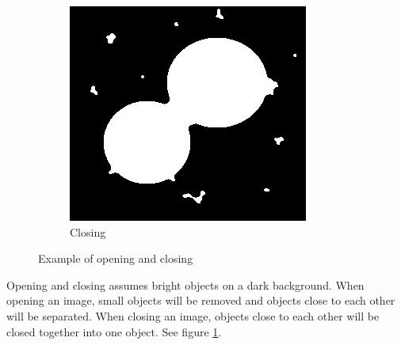 \begin{figure}[h]
    \begin{subfigure}{.33\textwidth}
        \centering
        \includegraphics[width=.9\linewidth]{images/literature/closing}
        \caption{Closing}
    \end{subfigure}
    \caption{Example of opening and closing}
    \label{fig:dots_opening_closing}
\end{figure}

Opening and closing assumes bright objects on a dark background. When opening an image, small objects will be removed and objects close to each other will be separated. When closing an image, objects close to each other will be closed together into one object. See figure \ref{fig:dots_opening_closing}.



